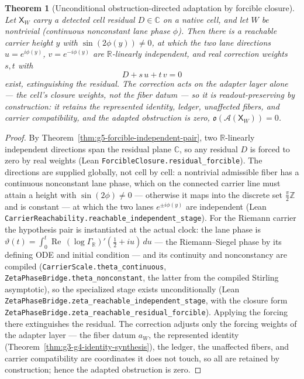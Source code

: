 \documentclass[11pt]{article}
\newtheorem{theorem}{Theorem}
\theoremstyle{definition}
\begin{document}
\begin{theorem}[Unconditional obstruction-directed adaptation by forcible closure]\label{thm:g10-obstruction-adaptation}
Let \(\mathsf X_W\) carry a detected cell residual \(D\in\mathbb C\) on a native
cell, and let \(W\) be nontrivial (continuous nonconstant lane phase \(\phi\)).
Then there is a reachable carrier height \(y\) with \(\sin(2\phi(y))\neq0\), at
which the two lane directions \(u=e^{i\phi(y)}\), \(v=e^{-i\phi(y)}\) are
\(\mathbb R\)-linearly independent, and real correction weights \(s,t\) with
\[
D+s\,u+t\,v=0
\]
exist, extinguishing the residual.  The correction acts on the adapter layer
alone --- the cell's closure weights, not the fiber datum --- so it is
readout-preserving by construction: it retains the represented identity,
ledger, unaffected fibers, and carrier compatibility, and the adapted
obstruction is zero, \(\mathfrak o(\mathcal A(\mathsf X_W))=0\).
\end{theorem}

\begin{proof}
By Theorem~\ref{thm:g5-forcible-independent-pair}, two \(\mathbb R\)-linearly
independent directions span the residual plane \(\mathbb C\), so any residual
\(D\) is forced to zero by real weights (Lean
\texttt{ForcibleClosure.residual\_forcible}).  The directions are supplied
globally, not cell by cell: a nontrivial admissible fiber has a continuous
nonconstant lane phase, which on the connected carrier line must attain a height
with \(\sin(2\phi)\neq0\) --- otherwise it maps into the discrete set
\(\tfrac{\pi}{2}\mathbb Z\) and is constant --- at which the two lanes
\(e^{\pm i\phi(y)}\) are independent (Lean
\texttt{CarrierReachability.reachable\_independent\_stage}).  For the Riemann
carrier the hypothesis pair is instantiated at the actual clock: the lane phase
is \(\vartheta(t)=\int_0^t \operatorname{Re}\,(\log\Gamma_{\mathbb R})'(\tfrac12+iu)\,du\)
--- the Riemann--Siegel phase by its defining ODE and initial condition --- and
its continuity and nonconstancy are compiled
(\texttt{CarrierScale.theta\_continuous},
\texttt{ZetaPhaseBridge.theta\_nonconstant}, the latter from the compiled
Stirling asymptotic), so the specialized stage exists unconditionally (Lean
\texttt{ZetaPhaseBridge.zeta\_reachable\_independent\_stage}, with the closure
form \texttt{ZetaPhaseBridge.zeta\_reachable\_residual\_forcible}).  Applying the
forcing there extinguishes the residual.  The correction adjusts only the
forcing weights of the adapter layer --- the fiber datum \(a_W\), the
represented identity (Theorem~\ref{thm:g3-g4-identity-synthesis}), the ledger,
the unaffected fibers, and carrier compatibility are coordinates it does not
touch, so all are retained by construction; hence the adapted obstruction is
zero.
\end{proof}
\end{document}
